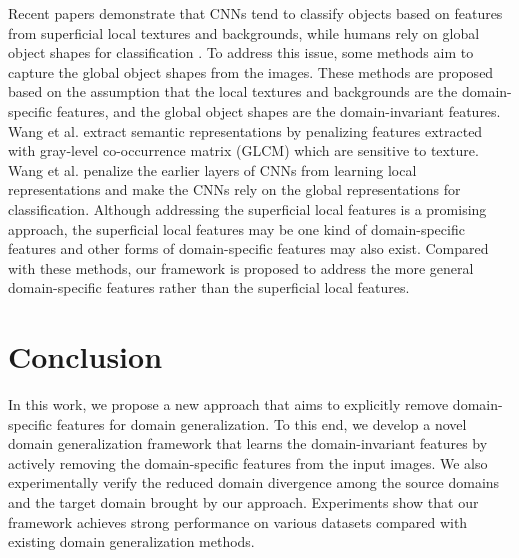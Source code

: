 \documentclass{article}
\begin{document}
Recent papers demonstrate that CNNs tend to classify objects based on features from superficial local textures and backgrounds, while humans rely on global object shapes for classification \cite{jo2017measuring,geirhos2018imagenet}. To address this issue, some methods aim to capture the global object shapes from the images. These methods are proposed based on the assumption that the local textures and backgrounds are the domain-specific features, and the global object shapes are the domain-invariant features. Wang et al. \cite{wang2019learningproject} extract semantic representations by penalizing features extracted with gray-level co-occurrence matrix (GLCM) which are sensitive to texture. Wang et al. \cite{wang2019learning} penalize the earlier layers of CNNs from learning local representations and make the CNNs rely on the global representations for classification. Although addressing the superficial local features is a promising approach, the superficial local features may be one kind of domain-specific features and other forms of domain-specific features may also exist. Compared with these methods, our framework is proposed to address the more general domain-specific features rather than the superficial local features. 

\section{Conclusion}
\label{conclusion}

In this work, we propose a new approach that aims to explicitly remove domain-specific features for domain generalization. To this end, we develop a novel domain generalization framework that learns the domain-invariant features by actively removing the domain-specific features from the input images. We also experimentally verify the reduced domain divergence among the source domains and the target domain brought by our approach. Experiments show that our framework achieves strong performance on various datasets compared with existing domain generalization methods.
\end{document}

